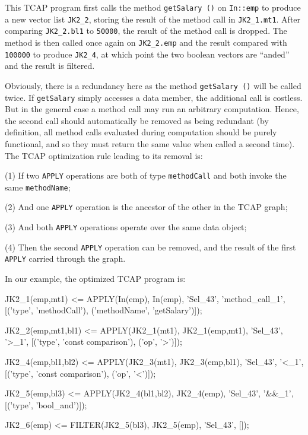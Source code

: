 \noindent
This TCAP program first calls the method \texttt{getSalary ()} on \texttt{In::emp} to produce a new vector list \texttt{JK2\_2}, storing the result
of the method call in \texttt{JK2\_1.mt1}.  After comparing \texttt{JK2\_2.bl1} to \texttt{50000}, the result of the method call is dropped.
The method is then called once again on \texttt{JK2\_2.emp} and the result compared with \texttt{100000} to produce \texttt{JK2\_4}, at which 
point the two boolean vectors are ``anded'' and the result is filtered.

Obviously, there is a redundancy here as the method \texttt{getSalary ()} will be called twice.
If \texttt{getSalary} simply accesses a data member, the additional call is costless.  But in the general case a method call may run an arbitrary
computation.  Hence, the second call should automatically be removed as being redundant 
(by definition, all method calls evaluated during computation should
be purely functional, and so they must return the same value when called a second time).
The TCAP optimization rule leading to its removal is:

\vspace{5pt}

\noindent
(1) If two \texttt{APPLY} operations are both of type \texttt{methodCall} and both invoke the same \texttt{methodName};

\noindent
(2) And one \texttt{APPLY} operation is the ancestor of the other in the TCAP graph;

\noindent
(3) And both \texttt{APPLY} operations operate over the same data object;

\noindent
(4) Then the second \texttt{APPLY} operation can be removed, and the
result of the first \texttt{APPLY} carried through the graph.

\vspace{5pt}

\noindent
In our example, the
optimized
TCAP program is:

\begin{codesmall}
JK2_1(emp,mt1) <= APPLY(In(emp), 
    In(emp), 'Sel_43', 'method_call_1',
   [('type', 'methodCall'), ('methodName', 'getSalary')]);

JK2_2(emp,mt1,bl1) <= APPLY(JK2_1(mt1), 
   JK2_1(emp,mt1), 'Sel_43', '>_1', 
  [('type', 'const comparison'), ('op', '>')]);

JK2_4(emp,bl1,bl2) <= APPLY(JK2_3(mt1), 
   JK2_3(emp,bl1), 'Sel_43', '<_1', 
  [('type', 'const comparison'), ('op', '<')]);

JK2_5(emp,bl3) <= APPLY(JK2_4(bl1,bl2),
   JK2_4(emp), 'Sel_43', '&&_1', 
  [('type', 'bool_and')]);

JK2_6(emp) <= FILTER(JK2_5(bl3), 
  JK2_5(emp), 'Sel_43', []);
  
\end{codesmall}

